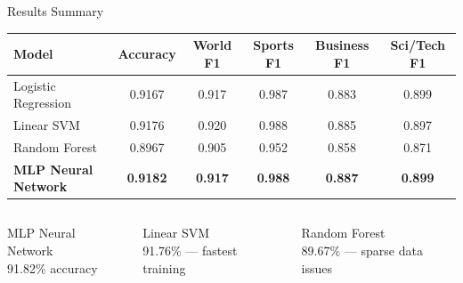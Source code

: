 \documentclass[aspectratio=169,11pt]{beamer}
\begin{document}
\begin{frame}{Results Summary}
\begin{center}
\begin{tcolorbox}[colback=light,colframe=primary,title=\textbf{Final Model Comparison --- AG News Test Set (7,600 articles)},fonttitle=\normalsize\bfseries,width=\textwidth]
  \centering\small
  \setlength{\tabcolsep}{6pt}
  \begin{tabular}{lccccc}
    \toprule
    \textbf{Model} & \textbf{Accuracy} & \textbf{World F1} & \textbf{Sports F1} & \textbf{Business F1} & \textbf{Sci/Tech F1}\\
    \midrule
    \rowcolor{worldcol!20}
    Logistic Regression & 0.9167 & 0.917 & 0.987 & 0.883 & 0.899\\
    \rowcolor{sportscol!20}
    Linear SVM          & 0.9176 & 0.920 & 0.988 & 0.885 & 0.897\\
    \rowcolor{businesscol!20}
    Random Forest       & 0.8967 & 0.905 & 0.952 & 0.858 & 0.871\\
    \rowcolor{scitechcol!30}
    \textbf{MLP Neural Network} & \textbf{0.9182} & \textbf{0.917} & \textbf{0.988} & \textbf{0.887} & \textbf{0.899}\\
    \bottomrule
  \end{tabular}
\end{tcolorbox}
\end{center}
\vspace{4pt}
\begin{columns}
    \begin{tcolorbox}[colback=scitechcol!15,colframe=scitechcol,fonttitle=\footnotesize\bfseries,title=Best Overall]
      \centering\small MLP Neural Network\\91.82\% accuracy
    \end{tcolorbox}
    \begin{tcolorbox}[colback=sportscol!15,colframe=sportscol,fonttitle=\footnotesize\bfseries,title=Best Efficiency]
      \centering\small Linear SVM\\91.76\% --- fastest training
    \end{tcolorbox}
    \begin{tcolorbox}[colback=businesscol!15,colframe=businesscol,fonttitle=\footnotesize\bfseries,title=Weakest]
      \centering\small Random Forest\\89.67\% --- sparse data issues
    \end{tcolorbox}
\end{columns}
\end{frame}
\end{document}
